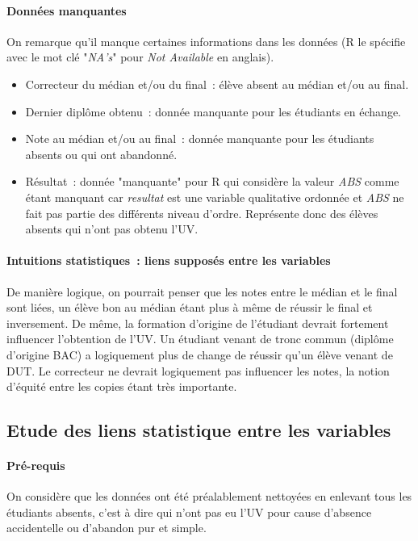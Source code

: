 \documentclass[a4paper,12pt]{report}
\begin{document}
\paragraph{Données manquantes}
On remarque qu'il manque certaines informations dans les données (R le spécifie avec le mot clé "\textit{NA's}" pour \textit{Not Available} en anglais).
\begin{itemize}
	\item Correcteur du médian et/ou du final~: élève absent au médian et/ou au final.
	\item Dernier diplôme obtenu~: donnée manquante pour les étudiants en échange.
	\item Note au médian et/ou au final~: donnée manquante pour les étudiants absents ou qui ont abandonné.
	\item Résultat~: donnée "manquante" pour R qui considère la valeur \textit{ABS} comme étant manquant car \textit{resultat} est une variable qualitative ordonnée et \textit{ABS} ne fait pas partie des différents niveau d'ordre. Représente donc des élèves absents qui n'ont pas obtenu l'UV.
\end{itemize}


\paragraph{Intuitions statistiques~: liens supposés entre les variables}
De manière logique, on pourrait penser que les notes entre le médian et le final sont liées, un élève bon au médian étant plus à même de réussir le final et inversement. De même, la formation d'origine de l'étudiant devrait fortement influencer l'obtention de l'UV. Un étudiant venant de tronc commun (diplôme d'origine BAC) a logiquement plus de change de réussir qu'un élève venant de DUT. Le correcteur ne devrait logiquement pas influencer les notes, la notion d'équité entre les copies étant très importante.




\subsection{Etude des liens statistique entre les variables}

\paragraph{Pré-requis}
On considère que les données ont été préalablement nettoyées en enlevant tous les étudiants absents, c'est à dire qui n'ont pas eu l'UV pour cause d'absence accidentelle ou d'abandon pur et simple.
\end{document}
